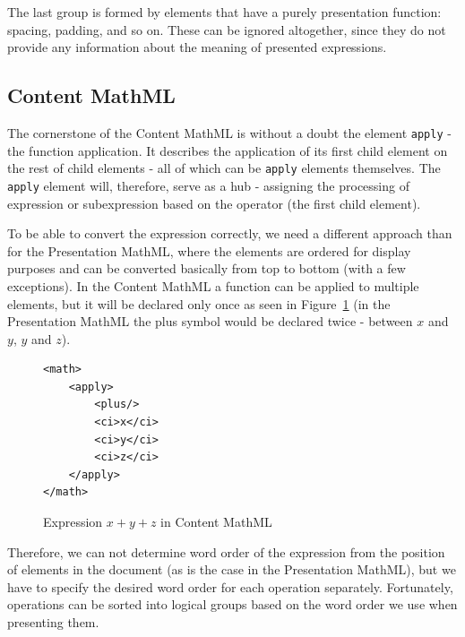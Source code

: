 \documentclass[11pt,oneside,final]{fithesis2}
\begin{document}
The last group is formed by elements that have a purely presentation function: spacing, padding, and so on. These can be ignored altogether, since they do not provide any information about the meaning of presented expressions.


\subsection{Content MathML}
\label{section:analysis-content}
The cornerstone of the Content MathML is without a doubt the element \texttt{apply} - the function application. It describes the application of its first child element on the rest of child elements - all of which can be \texttt{apply} elements themselves. The \texttt{apply} element will, therefore, serve as a hub - assigning the processing of expression or subexpression based on the operator (the first child element).

To be able to convert the expression correctly, we need a different approach than for the Presentation MathML, where the elements are ordered for display purposes and can be converted basically from top to bottom (with a few exceptions). In the Content MathML a function can be applied to multiple elements, but it will be declared only once as seen in Figure~\ref{fig:mathplus} (in the Presentation MathML the plus symbol would be declared twice - between $x$ and $y$, $y$ and $z$).

\begin{figure}[!ht]
\lstset{language=XML,frame=lines}
\begin{lstlisting}
<math>
	<apply>
		<plus/>
		<ci>x</ci>
		<ci>y</ci>
		<ci>z</ci>
	</apply>
</math>
\end{lstlisting}
\caption{Expression $x+y+z$ in Content MathML}
\label{fig:mathplus}
\end{figure}

Therefore, we can not determine word order of the expression from the position of elements in the document (as is the case in the Presentation MathML), but we have to specify the desired word order for each operation separately. Fortunately, operations can be sorted into logical groups based on the word order we use when presenting them.
\end{document}
